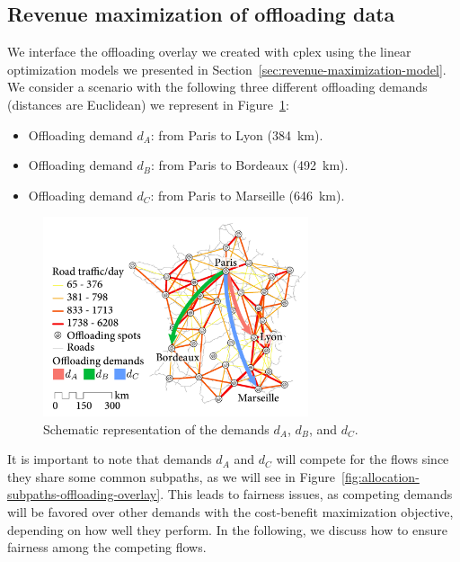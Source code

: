 \subsection{Revenue maximization of offloading data}
\label{sec:res-revenue-max-model}

We interface the offloading overlay we created with \acrshort{cplex} using the linear optimization models we presented in Section~\ref{sec:revenue-maximization-model}. We consider a scenario with the following three different offloading demands (distances are Euclidean) we represent in Figure~\ref{fig:france-demand-allocation-feasibility}:

\begin{itemize}

	\item Offloading demand $d_A$: from Paris to Lyon (384~km).

	\item Offloading demand $d_B$: from Paris to Bordeaux (492~km).

	\item Offloading demand $d_C$: from Paris to Marseille (646~km). 

\end{itemize}

\begin{figure}
    \vspace{-5pt}
    \centering
    \includegraphics[width=7.8cm]{figures/France-overlay-feasibility.pdf}
    \caption{Schematic representation of the demands $d_A$, $d_B$, and $d_C$.}
    \label{fig:france-demand-allocation-feasibility}
\end{figure}
It is important to note that demands $d_A$ and $d_C$ will compete for the flows since they share some common subpaths, as we will see in Figure~\ref{fig:allocation-subpaths-offloading-overlay}. This leads to fairness issues, as competing demands will be favored over other demands with the cost-benefit maximization objective, depending on how well they perform. In the following, we discuss how to ensure fairness among the competing flows.

